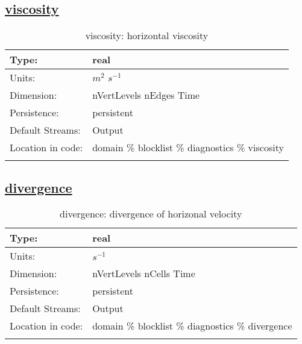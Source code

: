 \subsection[viscosity]{\hyperref[sec:var_tab_diagnostics]{viscosity}}
\label{subsec:var_sec_diagnostics_viscosity}
\begin{center}
\begin{longtable}{| p{2.0in} | p{4.0in} |}
        \hline 
        Type: & real \\
        \hline 
        Units: & $m^2$ $s^{-1}$ \\
        \hline 
        Dimension: & nVertLevels nEdges Time \\
        \hline 
        Persistence: & persistent \\
        \hline 
		 Default Streams: & Output  \\
        \hline 
		 Location in code: & domain \% blocklist \% diagnostics \% viscosity \\
		 \hline 
    \caption{viscosity: horizontal viscosity}
\end{longtable}
\end{center}
\subsection[divergence]{\hyperref[sec:var_tab_diagnostics]{divergence}}
\label{subsec:var_sec_diagnostics_divergence}
\begin{center}
\begin{longtable}{| p{2.0in} | p{4.0in} |}
        \hline 
        Type: & real \\
        \hline 
        Units: & $s^{-1}$ \\
        \hline 
        Dimension: & nVertLevels nCells Time \\
        \hline 
        Persistence: & persistent \\
        \hline 
		 Default Streams: & Output  \\
        \hline 
		 Location in code: & domain \% blocklist \% diagnostics \% divergence \\
		 \hline 
    \caption{divergence: divergence of horizonal velocity}
\end{longtable}
\end{center}
